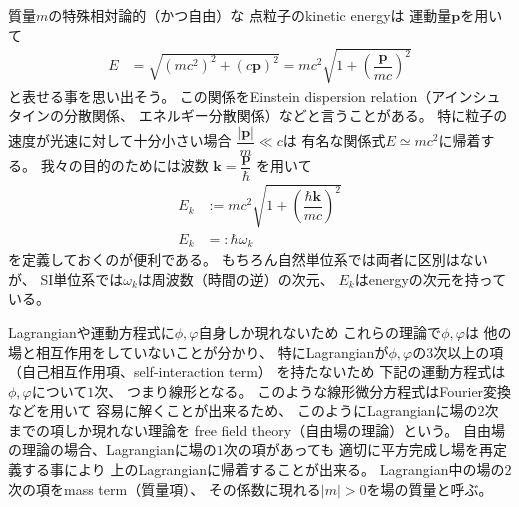 質量$m$の特殊相対論的（かつ自由）な
点粒子のkinetic energyは
運動量$\bm{p}$を用いて
\begin{align}
    E
&=
    \sqrt{(mc^2)^2 + (c\bm{p})^2}
=
    mc^2
    \sqrt{1 + \left(
        \dfrac{\bm{p}}{mc}
    \right)^2}
\end{align}
と表せる事を思い出そう。
この関係をEinstein dispersion relation（アインシュタインの分散関係、
エネルギー分散関係）などと言うことがある。
特に粒子の速度が光速に対して十分小さい場合
$\dfrac{|\bm{p}|}{m} \ll c$は
有名な関係式$E \simeq mc^2$に帰着する。
我々の目的のためには波数
$\bm{k} = \dfrac{\bm{p}}{\hbar}$
を用いて
\begin{subequations}
\begin{align}
    E_k
&:=
    mc^2
    \sqrt{1 + \left(
        \dfrac{\hbar \bm{k}}{mc}
    \right)^2}
\\
    E_k
&=: \hbar \omega_k
\end{align}
\end{subequations}
を定義しておくのが便利である。
もちろん自然単位系では両者に区別はないが、
SI単位系では$\omega_k$は周波数（時間の逆）の次元、
$E_k$はenergyの次元を持っている。

Lagrangianや運動方程式に$\phi, \varphi$自身しか現れないため
これらの理論で$\phi, \varphi$は
他の場と相互作用をしていないことが分かり、
特にLagrangianが$\phi, \varphi$の$3$次以上の項
（自己相互作用項、self-interaction term）
を持たないため
下記の運動方程式は$\phi, \varphi$について$1$次、
つまり線形となる。
このような線形微分方程式はFourier変換などを用いて
容易に解くことが出来るため、
このようにLagrangianに場の$2$次までの項しか現れない理論を
free field theory（自由場の理論）という。
自由場の理論の場合、Lagrangianに場の$1$次の項があっても
適切に平方完成し場を再定義する事により
上のLagrangianに帰着することが出来る。
Lagrangian中の場の$2$次の項をmass term（質量項）、
その係数に現れる$|m| > 0$を場の質量と呼ぶ。

